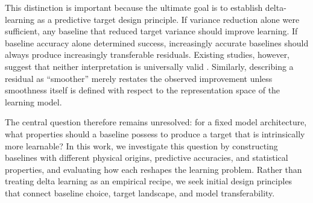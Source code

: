 This distinction is important because the ultimate goal is to establish delta-learning as a predictive target design principle. If variance reduction alone were sufficient, any baseline that reduced target variance should improve learning. If baseline accuracy alone determined success, increasingly accurate baselines should always produce increasingly transferable residuals. Existing studies, however, suggest that neither interpretation is universally valid \cite{atz2022deltaqml,chen2023solutiondelta,krug2025aha}. Similarly, describing a residual as ``smoother'' merely restates the observed improvement unless smoothness itself is defined with respect to the representation space of the learning model.

The central question therefore remains unresolved: for a fixed model architecture, what properties should a baseline possess to produce a target that is intrinsically more learnable? In this work, we investigate this question by constructing baselines with different physical origins, predictive accuracies, and statistical properties, and evaluating how each reshapes the learning problem. Rather than treating delta learning as an empirical recipe, we seek initial design principles that connect baseline choice, target landscape, and model transferability.
